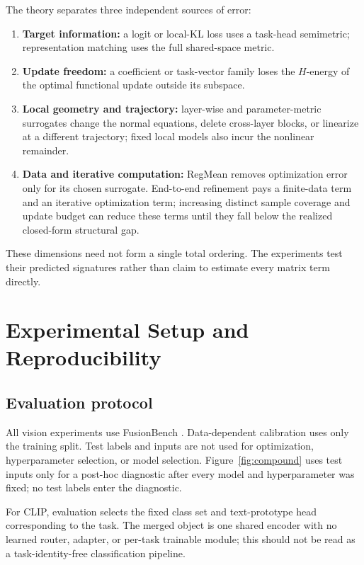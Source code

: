 \documentclass[letterpaper]{article} %
\theoremstyle{plain}
\theoremstyle{definition}
\begin{document}
The theory separates three independent sources of error:
\begin{enumerate}
    \item \textbf{Target information:} a logit or local-KL loss uses a task-head
    semimetric; representation matching uses the full shared-space metric.
    \item \textbf{Update freedom:} a coefficient or task-vector family loses the
    $H$-energy of the optimal functional update outside its subspace.
    \item \textbf{Local geometry and trajectory:} layer-wise and parameter-metric
    surrogates change the normal equations, delete cross-layer blocks, or linearize at a
    different trajectory; fixed local models also incur the nonlinear remainder.
    \item \textbf{Data and iterative computation:} RegMean removes optimization error only
    for its chosen surrogate. End-to-end refinement pays a finite-data term and an
    iterative optimization term; increasing distinct sample coverage and update budget can
    reduce these terms until they fall below the realized closed-form structural gap.
\end{enumerate}
These dimensions need not form a single total ordering. The experiments test their
predicted signatures rather than claim to estimate every matrix term directly.
\section{Experimental Setup and Reproducibility}
\label{app:setup}

\subsection{Evaluation protocol}
All vision experiments use FusionBench \citep{tang2024fusionbench}. Data-dependent
calibration uses only the training split. Test labels and inputs are not used for
optimization, hyperparameter selection, or model selection. Figure~\ref{fig:compound}
uses test inputs only for a post-hoc diagnostic after every model and hyperparameter was
fixed; no test labels enter the diagnostic.

For CLIP, evaluation selects the fixed class set and text-prototype head corresponding to
the task. The merged object is one shared encoder with no learned router, adapter, or
per-task trainable module; this should not be read as a task-identity-free classification
pipeline.
\end{document}
